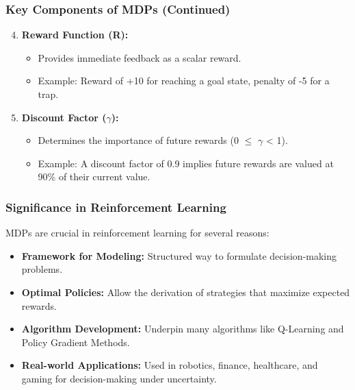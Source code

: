 \documentclass[aspectratio=169]{beamer}
\begin{document}
\begin{frame}[fragile]
    \frametitle{Key Components of MDPs (Continued)}
    \begin{enumerate}
        \setcounter{enumi}{3} %
        \item \textbf{Reward Function (R):}
        \begin{itemize}
            \item Provides immediate feedback as a scalar reward.
            \item Example: Reward of +10 for reaching a goal state, penalty of -5 for a trap.
        \end{itemize}
        
        \item \textbf{Discount Factor ($\gamma$):}
        \begin{itemize}
            \item Determines the importance of future rewards (0 $\leq$ $\gamma$ < 1).
            \item Example: A discount factor of 0.9 implies future rewards are valued at 90\% of their current value.
        \end{itemize}
    \end{enumerate}
\end{frame}

\begin{frame}[fragile]
    \frametitle{Significance in Reinforcement Learning}
    MDPs are crucial in reinforcement learning for several reasons:
    \begin{itemize}
        \item \textbf{Framework for Modeling:} Structured way to formulate decision-making problems.
        \item \textbf{Optimal Policies:} Allow the derivation of strategies that maximize expected rewards.
        \item \textbf{Algorithm Development:} Underpin many algorithms like Q-Learning and Policy Gradient Methods.
        \item \textbf{Real-world Applications:} Used in robotics, finance, healthcare, and gaming for decision-making under uncertainty.
    \end{itemize}
\end{frame}
\end{document}
